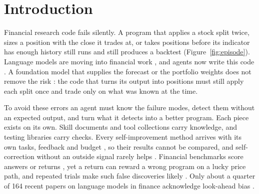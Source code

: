 \section{Introduction}
\label{sec:intro}

Financial research code fails silently. A program that applies a stock split twice, sizes a
position with the close it trades at, or takes positions before its indicator has enough
history still runs and still produces a backtest (Figure~\ref{fig:episode}). Language models
are moving into financial work \citep{nie2024survey,kong2024applications,dong2025agents}, and
agents now write this code \citep{zhang2024finagent,bigeard2025finance}. A foundation model
that supplies the forecast or the portfolio weights does not remove the risk
\citep{jin2024timellm,liang2024foundation,hwang2025decision}: the code that turns its output
into positions must still apply each split once and trade only on what was known at the time.

To avoid these errors an agent must know the failure modes, detect them without an expected
output, and turn what it detects into a better program. Each piece exists on its own. Skill
documents and tool collections carry knowledge, and testing libraries carry checks. Every
self-improvement method arrives with its own tasks, feedback and budget
\citep{shinn2023reflexion,chen2024selfdebug,zhao2024expel,agrawal2026gepa}, so their results
cannot be compared, and self-correction without an outside signal rarely helps
\citep{huang2024cannot}. Financial benchmarks score answers or returns
\citep{xie2024finben,chen2025stockbench}, yet a return can reward a wrong program on a lucky
price path, and repeated trials make such false discoveries likely \citep{bailey2017pbo}. Only
about a quarter of 164 recent papers on language models in finance acknowledge look-ahead bias
\citep{kong2026bias}.


